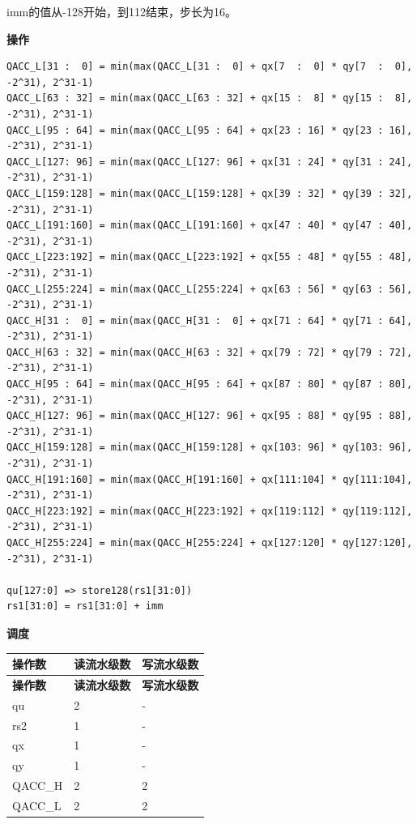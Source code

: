 imm的值从-128开始，到112结束，步长为16。

\textbf{操作}\\
\begin{lstlisting}
QACC_L[31 :  0] = min(max(QACC_L[31 :  0] + qx[7  :  0] * qy[7  :  0], -2^31), 2^31-1)
QACC_L[63 : 32] = min(max(QACC_L[63 : 32] + qx[15 :  8] * qy[15 :  8], -2^31), 2^31-1)
QACC_L[95 : 64] = min(max(QACC_L[95 : 64] + qx[23 : 16] * qy[23 : 16], -2^31), 2^31-1)
QACC_L[127: 96] = min(max(QACC_L[127: 96] + qx[31 : 24] * qy[31 : 24], -2^31), 2^31-1)
QACC_L[159:128] = min(max(QACC_L[159:128] + qx[39 : 32] * qy[39 : 32], -2^31), 2^31-1)
QACC_L[191:160] = min(max(QACC_L[191:160] + qx[47 : 40] * qy[47 : 40], -2^31), 2^31-1)
QACC_L[223:192] = min(max(QACC_L[223:192] + qx[55 : 48] * qy[55 : 48], -2^31), 2^31-1)
QACC_L[255:224] = min(max(QACC_L[255:224] + qx[63 : 56] * qy[63 : 56], -2^31), 2^31-1)
QACC_H[31 :  0] = min(max(QACC_H[31 :  0] + qx[71 : 64] * qy[71 : 64], -2^31), 2^31-1)
QACC_H[63 : 32] = min(max(QACC_H[63 : 32] + qx[79 : 72] * qy[79 : 72], -2^31), 2^31-1)
QACC_H[95 : 64] = min(max(QACC_H[95 : 64] + qx[87 : 80] * qy[87 : 80], -2^31), 2^31-1)
QACC_H[127: 96] = min(max(QACC_H[127: 96] + qx[95 : 88] * qy[95 : 88], -2^31), 2^31-1)
QACC_H[159:128] = min(max(QACC_H[159:128] + qx[103: 96] * qy[103: 96], -2^31), 2^31-1)
QACC_H[191:160] = min(max(QACC_H[191:160] + qx[111:104] * qy[111:104], -2^31), 2^31-1)
QACC_H[223:192] = min(max(QACC_H[223:192] + qx[119:112] * qy[119:112], -2^31), 2^31-1)
QACC_H[255:224] = min(max(QACC_H[255:224] + qx[127:120] * qy[127:120], -2^31), 2^31-1)

qu[127:0] => store128(rs1[31:0])
rs1[31:0] = rs1[31:0] + imm
\end{lstlisting}

\textbf{调度}\\
\begin{longtable}[c]{|l|l|l|}
    \hline
    \rowcolor{lightgray}
    \textbf{操作数} & \textbf{读流水级数} & \textbf{写流水级数} \\\hline
    \endfirsthead
    \hline
    \rowcolor{lightgray}
     \textbf{操作数} & \textbf{读流水级数} & \textbf{写流水级数} \\\hline
    \endhead
    \hline
    \endfoot

    qu & 2 & - \\\hline
    rs2 & 1 & - \\\hline
     qx & 1 & - \\\hline
     qy & 1 & - \\\hline
     QACC\_H & 2 & 2 \\\hline
     QACC\_L & 2 & 2

\end{longtable}

